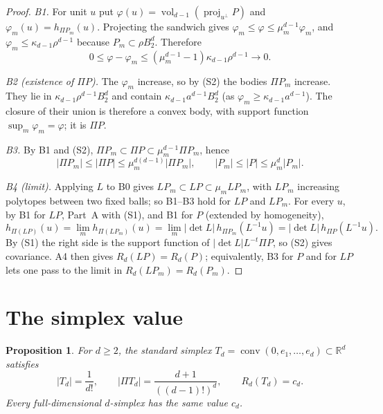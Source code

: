 \documentclass[11pt]{article}
\newtheorem{proposition}[theorem]{Proposition}
\newcommand{\R}{\mathbb R}
\DeclareMathOperator{\conv}{conv}
\DeclareMathOperator{\vol}{vol}
\DeclareMathOperator{\proj}{proj}
\begin{document}
\begin{proof}
\emph{B1.} For unit \(u\) put \(\varphi(u)=\vol_{d-1}(\proj_{u^\perp}P)\) and \(\varphi_m(u)=h_{\Pi P_m}(u)\). Projecting the sandwich gives \(\varphi_m\le\varphi\le\mu_m^{d-1}\varphi_m\), and \(\varphi_m\le\kappa_{d-1}\rho^{d-1}\) because \(P_m\subset\rho B_2^d\). Therefore
\[
 0\le\varphi-\varphi_m\le(\mu_m^{d-1}-1)\kappa_{d-1}\rho^{d-1}\longrightarrow0 .
\]

\emph{B2 (existence of \(\Pi P\)).} The \(\varphi_m\) increase, so by (S2) the bodies \(\Pi P_m\) increase. They lie in \(\kappa_{d-1}\rho^{d-1}B_2^d\) and contain \(\kappa_{d-1}a^{d-1}B_2^d\) (as \(\varphi_m\ge\kappa_{d-1}a^{d-1}\)). The closure of their union is therefore a convex body, with support function \(\sup_m\varphi_m=\varphi\); it is \(\Pi P\).

\emph{B3.} By B1 and (S2), \(\Pi P_m\subset\Pi P\subset\mu_m^{d-1}\Pi P_m\), hence
\[
 |\Pi P_m|\le|\Pi P|\le\mu_m^{d(d-1)}|\Pi P_m|,\qquad |P_m|\le|P|\le\mu_m^d|P_m| .
\]

\emph{B4 (limit).} Applying \(L\) to B0 gives \(LP_m\subset LP\subset\mu_mLP_m\), with \(LP_m\) increasing polytopes between two fixed balls; so B1--B3 hold for \(LP\) and \(LP_m\). For every \(u\), by B1 for \(LP\), Part~A with (S1), and B1 for \(P\) (extended by homogeneity),
\[
 h_{\Pi(LP)}(u)=\lim_m h_{\Pi(LP_m)}(u)=\lim_m|\det L|\,h_{\Pi P_m}(L^{-1}u)=|\det L|\,h_{\Pi P}(L^{-1}u).
\]
By (S1) the right side is the support function of \(|\det L|L^{-t}\Pi P\), so (S2) gives covariance. A4 then gives \(R_d(LP)=R_d(P)\); equivalently, B3 for \(P\) and for \(LP\) lets one pass to the limit in \(R_d(LP_m)=R_d(P_m)\).
\end{proof}

\section{The simplex value}\label{sec:simplex}

\begin{proposition}\label{prop:simplex}
For \(d\ge2\), the standard simplex \(T_d=\conv(0,e_1,\ldots,e_d)\subset\R^d\) satisfies
\[
 |T_d|=\frac1{d!},\qquad
 |\Pi T_d|=\frac{d+1}{((d-1)!)^d},\qquad
 R_d(T_d)=c_d.
\]
Every full-dimensional \(d\)-simplex has the same value \(c_d\).
\end{proposition}
\end{document}
